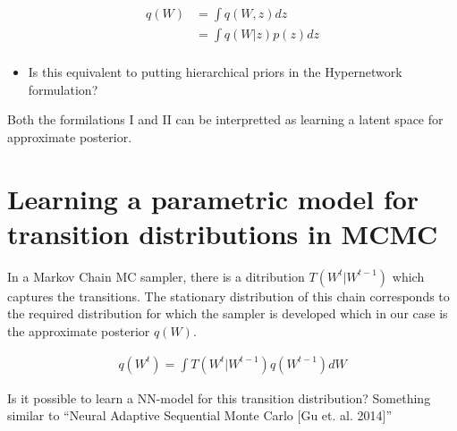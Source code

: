 \documentclass[twoside]{article}
\begin{document}
\begin{align}
q(W) &= \int q(W,z)dz\\
&= \int q(W|z)p(z)dz\\
\end{align}

\begin{itemize}
  \item Is this equivalent to putting hierarchical priors in the Hypernetwork formulation? 
\end{itemize}

Both the formilations I and II can be interpretted as learning a latent space for approximate posterior. 

 
\section{Learning a parametric model for transition distributions in MCMC}

In a Markov Chain MC sampler, there is a ditribution $T(W^{t}|W^{t-1})$ which captures the transitions. The stationary distribution of this chain corresponds to the required distribution for which the sampler is developed which in our case is the approximate posterior $q(W)$. 

\begin{align}
q(W^t) = \int T(W^{t}|W^{t-1})q(W^{t-1})dW
\end{align}

Is it possible to learn a NN-model for this transition distribution? Something similar to ``Neural Adaptive Sequential Monte Carlo [Gu et. al. 2014]''



%
%
\end{document}
